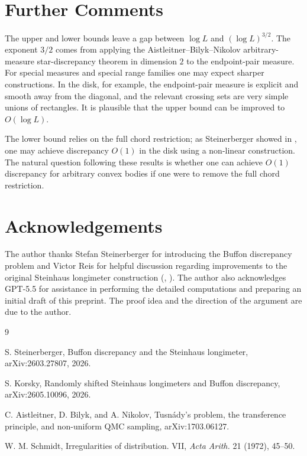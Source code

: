 \documentclass[11pt]{article}
\theoremstyle{definition}
\begin{document}
\section{Further Comments}

The upper and lower bounds leave a gap between $\log L$ and $(\log L)^{3/2}$.  The exponent $3/2$ comes from applying the Aistleitner--Bilyk--Nikolov arbitrary-measure star-discrepancy theorem in dimension $2$ to the endpoint-pair measure.  For special measures and special range families one may expect sharper constructions.  In the disk, for example, the endpoint-pair measure is explicit and smooth away from the diagonal, and the relevant crossing sets are very simple unions of rectangles.  It is plausible that the upper bound can be improved to $O(\log L)$.

\bigskip
\noindent
The lower bound relies on the full chord restriction; as Steinerberger showed in \cite{SteinerbergerBuffon}, one may achieve discrepancy $O(1)$ in the disk using a non-linear construction. The natural question following these results is whether one can achieve $O(1)$ discrepancy for arbitrary convex bodies if one were to remove the full chord restriction.

\section*{Acknowledgements} The author thanks Stefan Steinerberger for introducing the Buffon discrepancy problem and Victor Reis for helpful discussion regarding improvements to the original Steinhaus longimeter construction (\cite{SteinerbergerBuffon}, \cite{KorskyRandomShifted}). The author also acknowledges GPT-5.5 for assistance in performing the detailed computations and preparing an initial draft of this preprint. The proof idea and the direction of the argument are due to the author.

\begin{thebibliography}{9}

S. Steinerberger,
\newblock Buffon discrepancy and the Steinhaus longimeter,
\newblock arXiv:2603.27807, 2026.

S. Korsky,
\newblock Randomly shifted Steinhaus longimeters and Buffon discrepancy,
\newblock arXiv:2605.10096, 2026.

C. Aistleitner, D. Bilyk, and A. Nikolov,
\newblock Tusn\'ady's problem, the transference principle, and non-uniform QMC sampling,
\newblock arXiv:1703.06127.

W. M. Schmidt,
\newblock Irregularities of distribution. VII,
\newblock \emph{Acta Arith.} 21 (1972), 45--50.

\end{thebibliography}
\end{document}
